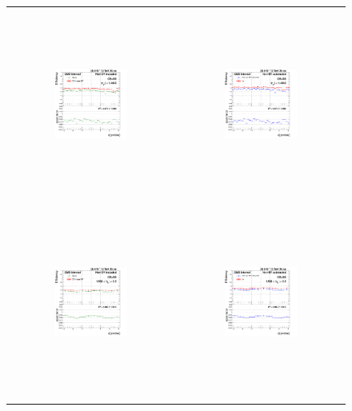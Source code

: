 \begin{figure}[htp]
  \begin{center}
    \begin{tabular}{cc}
      \includegraphics[width=0.45\textwidth,height=6.3cm]{figures/Zprime/2016/ScaleFactor/SameSign/nominal/g_compare_cut_phi_Barrel_ea_ta_inc_AS_nominal_PUW.png} &
      \includegraphics[width=0.45\textwidth,height=6.3cm]{figures/Zprime/2016/ScaleFactor/SameSign/nominal/g_compare_cut_phi_Barrel_ea_ta_exc_AS_nominal_PUW.png} \\
      \includegraphics[width=0.45\textwidth,height=6.3cm]{figures/Zprime/2016/ScaleFactor/SameSign/nominal/g_compare_cut_phi_Endcap_ea_ta_inc_AS_nominal_PUW.png} &
      \includegraphics[width=0.45\textwidth,height=6.3cm]{figures/Zprime/2016/ScaleFactor/SameSign/nominal/g_compare_cut_phi_Endcap_ea_ta_exc_AS_nominal_PUW.png}

\end{tabular}
\end{center}
\end{figure}
